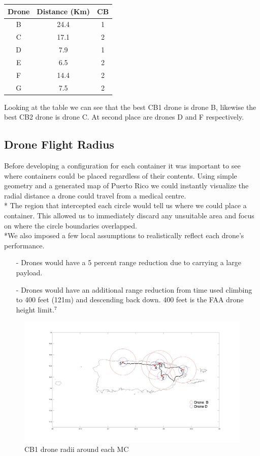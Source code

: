 \documentclass[a4paper,12pt]{article}
\begin{document}
\begin{center}
\begin{tabular}{ |c|c|c| }
 \hline
 Drone & Distance (Km) & CB \\\hline
  B & 24.4 & 1 \\
  C & 17.1 & 2  \\
  D & 7.9 & 1 \\
  E & 6.5 & 2 \\
  F & 14.4 & 2 \\
  G & 7.5 & 2 \\
 \hline
\end{tabular}
\end{center}
Looking at the table we can see that the best CB1 drone is drone B, likewise the best CB2 drone is drone C. At second place are drones D and F respectively.

\subsection{Drone Flight Radius}
Before developing a configuration for each container it was important to see where containers could be placed regardless of their contents.
Using simple geometry and a generated map of Puerto Rico we could instantly visualize the radial distance a drone could travel from a medical centre.\\*
The region that intercepted each circle would tell us where we could place a container. This allowed us to immediately discard any unsuitable area and focus on where the circle boundaries overlapped.
\\*We also imposed a few local assumptions to realistically reflect each drone's performance.

\begin{itemize}
\item[-]Drones would have a 5 percent range reduction due to carrying a large payload.
\item[-]Drones would have an additional range reduction from time used climbing to 400 feet (121m) and descending back down. 400 feet is the FAA drone height limit.$^7$
\end{itemize}

\begin{figure}[h]
\centering
\includegraphics[scale =0.15]{CB1}
\caption{CB1 drone radii around each MC}
\label{cb1}
\end{figure}
\end{document}

